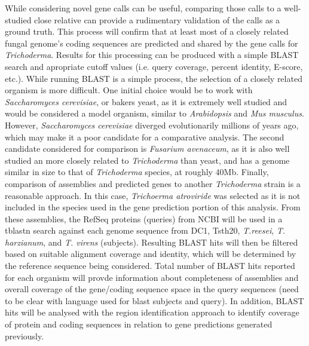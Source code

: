 While considering novel gene calls can be useful, comparing those
calls to a well-studied close relative can provide a rudimentary
validation of the calls as a ground truth. This process will confirm
that at least most of a closely related fungal genome's coding
sequences are predicted and shared by the gene calls for
\textit{Trichoderma}. Results for this processing can be produced with
a simple BLAST search and apropriate cutoff values (i.e. query
coverage, percent identity, E-score, etc.). While running BLAST is a
simple process, the selection of a closely related organism is more
difficult. One initial choice would be to work with
\textit{Saccharomyces cerevisiae}, or bakers yeast, as it is extremely
well studied and would be considered a model organism, similar to
\textit{Arabidopsis} and \textit{Mus musculus}. However,
\textit{Saccharomyces cerevisiae} diverged evolutionarily millions of
years ago, which may make it a poor candidate for a comparative
analysis. The second candidate considered for comparison is
\textit{Fusarium avenaceum}, as it is also well studied an more
closely related to \textit{Trichoderma} than yeast, and has a genome
similar in size to that of \textit{Trichoderma} species, at roughly
40Mb. Finally, comparison of assemblies and predicted genes to another
\textit{Trichoderma} strain is a reasonable approach. In this case,
\textit{Trichoerma atroviride} was selected as it is not included in
the species used in the gene prediction portion of this analysis. From
these assemblies, the RefSeq proteins (queries) from NCBI will be used
in a tblastn search against each genome sequence from DC1, Tsth20,
\textit{T.reesei}, \textit{T. harzianum}, and \textit{T. virens}
(subjects). Resulting BLAST hits will then be filtered based on
suitable alignment coverage and identity, which will be determined by
the reference sequence being considered. Total number of BLAST hits
reported for each organism will provde information about completeness
of assemblies and overall coverage of the gene/coding sequence space
in the query sequences (need to be clear with language used for blast
subjects and query). In addition, BLAST hits will be analysed with the
region identification approach to identify coverage of protein and coding
sequences in relation to gene predictions generated previously.

